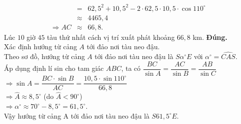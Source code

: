 \begin{ex}
{\begin{itemchoice}
\begin{eqnarray*}
				&=&62{,}5^2+10{,}5^2-2\cdot62{,}5\cdot10{,}5\cdot\cos 110^\circ\\
				&\approx& 4465{,}4\\
				\Rightarrow AC&\approx& 66{,}8.
			\end{eqnarray*}
Lúc $10$ giờ $45$ tàu thứ nhất cách vị trí xuất phát khoảng $66{,}8$ km.
\itemch \textbf{Đúng.}\\
Xác định hướng từ cảng $A$ tới đảo nơi tàu neo đậu.\\
Theo sơ đồ, hướng từ cảng $A$ tới đảo nơi tàu neo đậu là $S\alpha^\circ E$ với $\alpha^\circ=\widehat{CAS}$.\\
Áp dụng định lí sin cho tam giác $ABC$, ta có
$\dfrac{BC}{\sin A}=\dfrac{AC}{\sin B}=\dfrac{AB}{\sin C}$\\
$\Rightarrow \sin A=\dfrac{BC\cdot \sin B}{AC}=\dfrac{10{,}5\cdot \sin 110^\circ}{66,8}$\\
$\Rightarrow \widehat{A}\approx 8{,}5^\circ$ (do $\widehat{A} < 90^\circ$)\\
$\Rightarrow \alpha ^\circ \approx 70^\circ-8{,}5^\circ=61{,}5^\circ$.\\
Vậy hướng từ cảng A tới đảo nơi tàu neo đậu là $S61{,}5^\circ E$.
\end{itemchoice}		
}
\end{ex}

